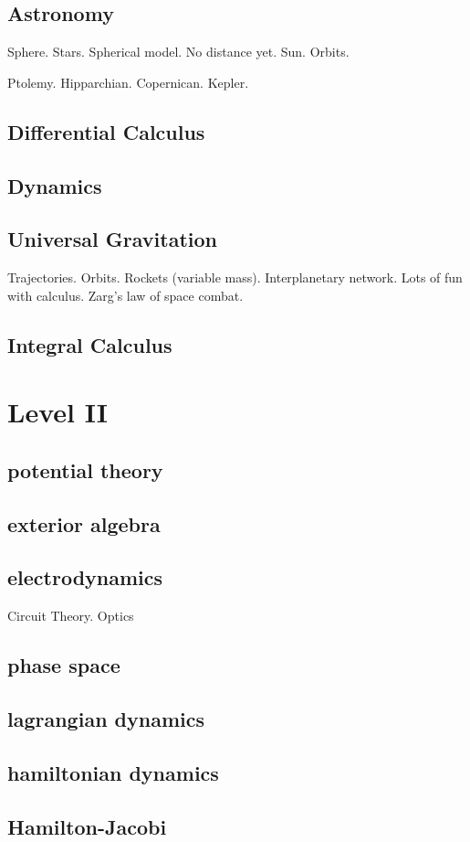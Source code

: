 \documentclass[main.tex]{subfilese}
\begin{document}
\chapter{Astronomy}
Sphere. Stars. Spherical model. No distance yet.
Sun. Orbits.

Ptolemy. Hipparchian. Copernican. Kepler.
\chapter{Differential Calculus}
\chapter{Dynamics}
\chapter{Universal Gravitation}

Trajectories. Orbits. Rockets (variable mass). Interplanetary network.
Lots of fun with calculus.
Zarg's law of space combat.
\chapter{Integral Calculus}
\part{Level II}
\chapter{potential theory}
\chapter{exterior algebra}
\chapter{electrodynamics}
Circuit Theory.
Optics
\chapter{phase space}
\chapter{lagrangian dynamics}
\chapter{hamiltonian dynamics}
\chapter{Hamilton-Jacobi}
\end{document}
